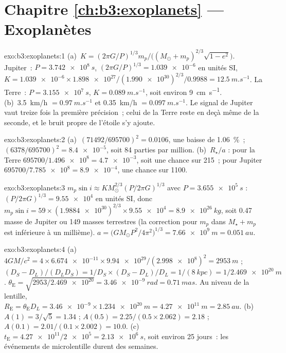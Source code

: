 \section*{Chapitre \ref{ch:b3:exoplanets} --- Exoplanètes}

\begin{solution}{exo:b3:exoplanets:1}
(a)~$K = (2\pi G/P)^{1/3}m_p/\bigl((M_\odot + m_p)^{2/3}\sqrt{1 - e^2}\bigr)$.
Jupiter~: $P = \qty{3.742e8}{s}$, $(2\pi G/P)^{1/3} = \num{1.039e-6}$ en unités
SI, $K = \num{1.039e-6}\times\num{1.898e27}/(\num{1.990e30})^{2/3}/0.9988
= \qty{12.5}{m.s^{-1}}$. La Terre~: $P = \qty{3.155e7}{s}$, $K =
\qty{0.089}{m.s^{-1}}$, soit environ \qty{9}{cm.s^{-1}}. (b)~\qty{3.5}{km/h} $=
\qty{0.97}{m.s^{-1}}$ et \qty{0.35}{km/h} $= \qty{0.097}{m.s^{-1}}$.
Le signal de Jupiter vaut treize fois la première précision~; celui de la
Terre reste en deçà même de la seconde, et le bruit propre de l'étoile s'y ajoute.
\end{solution}

\begin{solution}{exo:b3:exoplanets:2}
(a)~$(71492/695700)^2 = \num{0.0106}$, une baisse de \qty{1.06}{\percent}~;
$(6378/695700)^2 = \num{8.4e-5}$, soit 84 parties par million. (b)~$R_\star/a$ :
pour la Terre $695700/\num{1.496e8} = \num{4.7e-3}$, soit une chance sur 215~;
pour Jupiter $695700/\num{7.785e8} = \num{8.9e-4}$, une chance sur 1100.
\end{solution}

\begin{solution}{exo:b3:exoplanets:3}
$m_p\sin i \approx K M_\odot^{2/3}(P/2\pi G)^{1/3}$ avec $P =
\qty{3.655e5}{s}$ : $(P/2\pi G)^{1/3} = \num{9.55e4}$ en unités SI, donc $m_p
\sin i = 59\times(\num{1.9884e30})^{2/3}\times\num{9.55e4} =
\qty{8.9e26}{kg}$, soit 0.47 masse de Jupiter ou 149 masses terrestres (la
correction pour $m_p$ dans $M_\star + m_p$ est inférieure à un millième).
$a = \bigl(GM_\odot P^2/4\pi^2\bigr)^{1/3} = \qty{7.66e9}{m} =
\qty{0.051}{au}$.
\end{solution}

\begin{solution}{exo:b3:exoplanets:4}
(a)~$4GM/c^2 = 4\times\num{6.674e-11}\times\num{9.94e29}/(\num{2.998e8})^2 =
\qty{2953}{m}$ ; $(D_S - D_L)/(D_LD_S) = 1/D_S\times(D_S - D_L)/D_L =
1/(\qty{8}{kpc}) = 1/\qty{2.469e20}{m}$. $\theta_\mathrm E =
\sqrt{2953/\num{2.469e20}} = \qty{3.46e-9}{rad} = \qty{0.71}{mas}$. Au
niveau de la lentille, $R_\mathrm E = \theta_\mathrm E D_L = \num{3.46e-9}\times
\qty{1.234e20}{m} = \qty{4.27e11}{m} = \qty{2.85}{au}$. (b)~$A(1) =
3/\sqrt5 = 1.34$ ; $A(0.5) = 2.25/(0.5\times2.062) = 2.18$ ; $A(0.1) =
2.01/(0.1\times2.002) = 10.0$. (c)~$t_\mathrm E = \num{4.27e11}/\num{2e5}
= \qty{2.13e6}{s}$, soit environ 25 jours~: les événements de microlentille durent des semaines.
\end{solution}

